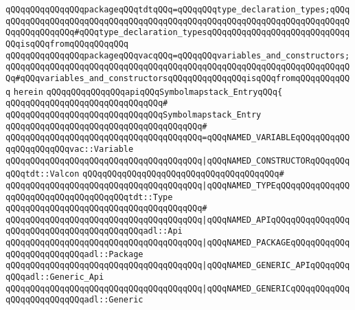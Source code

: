 \verb|qQQqqQQqqQQqqQQqpackageqQQqtdtqQQq=qQQqqQQqtype_declaration_types;qQQqqQQqqQQqqQQqqQQqqQQqqQQqqQQqqQQqqQQqqQQqqQQqqQQqqQQqqQQqqQQqqQQqqQQqqQQqqQQqqQQqqQQq#qQQqtype_declaration_typesqQQqqQQqqQQqqQQqqQQqqQQqqQQqqQQqisqQQqfromqQQqqQQqqQQq|\newline
\verb|qQQqqQQqqQQqqQQqpackageqQQqvacqQQq=qQQqqQQqvariables_and_constructors;qQQqqQQqqQQqqQQqqQQqqQQqqQQqqQQqqQQqqQQqqQQqqQQqqQQqqQQqqQQqqQQqqQQqqQQq#qQQqvariables_and_constructorsqQQqqQQqqQQqqQQqisqQQqfromqQQqqQQqqQQq|\newline
\verb|herein|\newline
\newline
\verb|qQQqqQQqqQQqqQQqapiqQQqSymbolmapstack_EntryqQQq{|\newline
\verb|qQQqqQQqqQQqqQQqqQQqqQQqqQQqqQQq#|\newline
\verb|qQQqqQQqqQQqqQQqqQQqqQQqqQQqqQQqSymbolmapstack_Entry|\newline
\verb|qQQqqQQqqQQqqQQqqQQqqQQqqQQqqQQqqQQqqQQq#|\newline
\verb|qQQqqQQqqQQqqQQqqQQqqQQqqQQqqQQqqQQqqQQq=qQQqNAMED_VARIABLEqQQqqQQqqQQqqQQqqQQqqQQqvac::Variable|\newline
\verb|qQQqqQQqqQQqqQQqqQQqqQQqqQQqqQQqqQQqqQQq|\verb#|qQQqNAMED_CONSTRUCTORqQQqqQQqqQQqtdt::Valcon#\newline
\verb|qQQqqQQqqQQqqQQqqQQqqQQqqQQqqQQqqQQqqQQq#|\newline
\verb|qQQqqQQqqQQqqQQqqQQqqQQqqQQqqQQqqQQqqQQq|\verb#|qQQqNAMED_TYPEqQQqqQQqqQQqqQQqqQQqqQQqqQQqqQQqqQQqqQQqtdt::Type#\newline
\verb|qQQqqQQqqQQqqQQqqQQqqQQqqQQqqQQqqQQqqQQq#|\newline
\verb|qQQqqQQqqQQqqQQqqQQqqQQqqQQqqQQqqQQqqQQq|\verb#|qQQqNAMED_APIqQQqqQQqqQQqqQQqqQQqqQQqqQQqqQQqqQQqqQQqqQQqadl::Api#\newline
\verb|qQQqqQQqqQQqqQQqqQQqqQQqqQQqqQQqqQQqqQQq|\verb#|qQQqNAMED_PACKAGEqQQqqQQqqQQqqQQqqQQqqQQqqQQqadl::Package#\newline
\verb|qQQqqQQqqQQqqQQqqQQqqQQqqQQqqQQqqQQqqQQq|\verb#|qQQqNAMED_GENERIC_APIqQQqqQQqqQQqadl::Generic_Api#\newline
\verb|qQQqqQQqqQQqqQQqqQQqqQQqqQQqqQQqqQQqqQQq|\verb#|qQQqNAMED_GENERICqQQqqQQqqQQqqQQqqQQqqQQqqQQqadl::Generic#\newline
